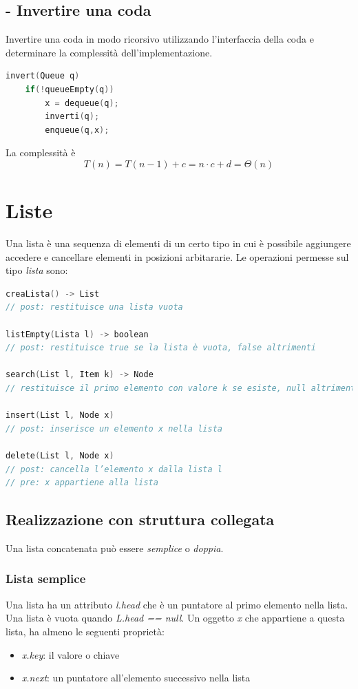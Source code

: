 \documentclass[italian]{article}
\newcommand{\dateright}[1]{\normalfont{\normalsize{\hfill #1 \\}}}
\newcommand{\exercize}{\text{\faPencil $\;$ Esercizio }}
\begin{document}
\subsection{\exercize - Invertire una coda}
Invertire una coda in modo ricorsivo utilizzando l'interfaccia della coda e determinare la complessità dell'implementazione.
\begin{lstlisting}[language=c,mathescape=true]
invert(Queue q)
	if(!queueEmpty(q))
		x = dequeue(q);
		inverti(q);
		enqueue(q,x);
\end{lstlisting}
La complessità è 
\[
	T(n) = T(n-1) + c = n\cdot c + d = \varTheta(n)
\]

\pagebreak

\section{Liste}
\dateright{9 Novembre 2016}
Una lista è una sequenza di elementi di un certo tipo in cui è possibile aggiungere accedere e cancellare elementi in posizioni arbitararie.
Le operazioni permesse sul tipo \textit{lista} sono:
\begin{lstlisting}[language=c,mathescape=true]
creaLista() -> List
// post: restituisce una lista vuota

listEmpty(Lista l) -> boolean
// post: restituisce true se la lista è vuota, false altrimenti 

search(List l, Item k) -> Node
// restituisce il primo elemento con valore k se esiste, null altrimenti 

insert(List l, Node x)
// post: inserisce un elemento x nella lista

delete(List l, Node x)
// post: cancella l’elemento x dalla lista l
// pre: x appartiene alla lista
\end{lstlisting}

\subsection{Realizzazione con struttura collegata}
Una lista concatenata può essere \textit{semplice} o \textit{doppia}.
\subsubsection{Lista semplice}
Una lista ha un attributo \textit{l.head} che è un puntatore al primo elemento nella lista. Una lista è vuota quando \textit{L.head == null}. Un oggetto \textit{x} che appartiene a questa lista, ha almeno le seguenti proprietà:
\begin{itemize}[itemsep=0pt]
	\item \textit{x.key}: il valore o chiave
	\item \textit{x.next}: un puntatore all’elemento successivo nella lista
\end{itemize}
\end{document}
